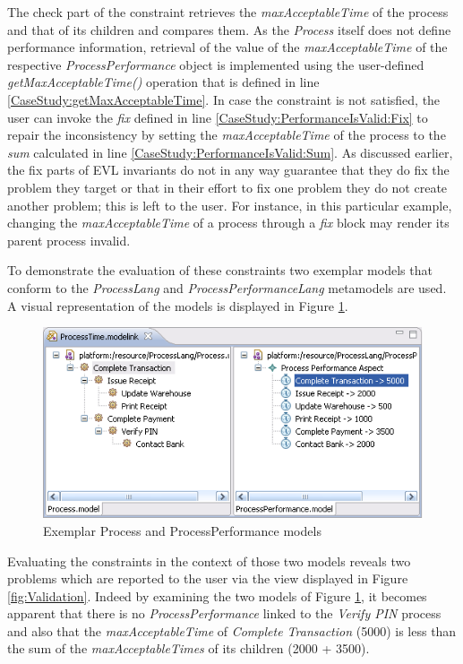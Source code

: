 The check part of the constraint retrieves the \emph{maxAcceptableTime} of the process and that of its children and compares them. As the \emph{Process} itself does not define performance information, retrieval of the value of the \emph{maxAcceptableTime} of the respective \emph{ProcessPerformance} object is implemented using the user-defined \emph{getMaxAcceptableTime()} operation that is defined in line \ref{CaseStudy:getMaxAcceptableTime}. In case the constraint is not satisfied, the user can invoke the \emph{fix} defined in line \ref{CaseStudy:PerformanceIsValid:Fix} to repair the inconsistency by setting the \emph{maxAcceptableTime} of the process to the \emph{sum} calculated in line \ref{CaseStudy:PerformanceIsValid:Sum}. As discussed earlier, the fix parts of EVL invariants do not in any way guarantee that they do fix the problem they target or that in their effort to fix one problem they do not create another problem; this is left to the user. For instance, in this particular example, changing the \emph{maxAcceptableTime} of a process through a \emph{fix} block may render its parent process invalid.


To demonstrate the evaluation of these constraints two exemplar models that conform to the \emph{ProcessLang} and \emph{ProcessPerformanceLang} metamodels are used. A visual representation of the models is displayed in Figure \ref{fig:ModeLink}.

\begin{figure}[h]
    \centering
    \includegraphics{images/ModeLink.png}
    \caption{Exemplar Process and ProcessPerformance models}
    \label{fig:ModeLink}
\end{figure}


Evaluating the constraints in the context of those two models reveals two problems which are reported to the user via the view displayed in Figure \ref{fig:Validation}. Indeed by examining the two models of Figure \ref{fig:ModeLink}, it becomes apparent that there is no \emph{ProcessPerformance} linked to the \emph{Verify PIN} process and also that the \emph{maxAcceptableTime} of \emph{Complete Transaction} (5000) is less than the sum of the \emph{maxAcceptableTimes} of its children (2000 + 3500).

